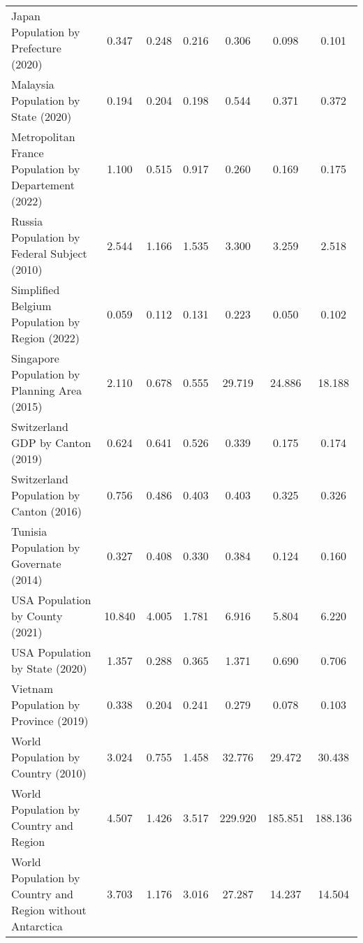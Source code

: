 \begin{tabular}{lccc|ccc}
Japan Population by Prefecture (2020) & 0.347 & 0.248 & 0.216 & 0.306 & 0.098 & 0.101 \\
Malaysia Population by State (2020) & 0.194 & 0.204 & 0.198 & 0.544 & 0.371 & 0.372 \\
Metropolitan France Population by Departement (2022) & 1.100 & 0.515 & 0.917 & 0.260 & 0.169 & 0.175 \\
Russia Population by Federal Subject (2010) & 2.544 & 1.166 & 1.535 & 3.300 & 3.259 & 2.518 \\
Simplified Belgium Population by Region (2022) & 0.059 & 0.112 & 0.131 & 0.223 & 0.050 & 0.102 \\
Singapore Population by Planning Area (2015) & 2.110 & 0.678 & 0.555 & 29.719 & 24.886 & 18.188 \\
Switzerland GDP by Canton (2019) & 0.624 & 0.641 & 0.526 & 0.339 & 0.175 & 0.174 \\
Switzerland Population by Canton (2016) & 0.756 & 0.486 & 0.403 & 0.403 & 0.325 & 0.326 \\
Tunisia Population by Governate (2014) & 0.327 & 0.408 & 0.330 & 0.384 & 0.124 & 0.160 \\
USA Population by County (2021) & 10.840 & 4.005 & 1.781 & 6.916 & 5.804 & 6.220 \\
USA Population by State (2020) & 1.357 & 0.288 & 0.365 & 1.371 & 0.690 & 0.706 \\
Vietnam Population by Province (2019) & 0.338 & 0.204 & 0.241 & 0.279 & 0.078 & 0.103 \\
World Population by Country (2010) & 3.024 & 0.755 & 1.458 & 32.776 & 29.472 & 30.438 \\
World Population by Country and Region & 4.507 & 1.426 & 3.517 & 229.920 & 185.851 & 188.136 \\
World Population by Country and Region without Antarctica & 3.703 & 1.176 & 3.016 & 27.287 & 14.237 & 14.504 \\
\bottomrule
\end{tabular}
